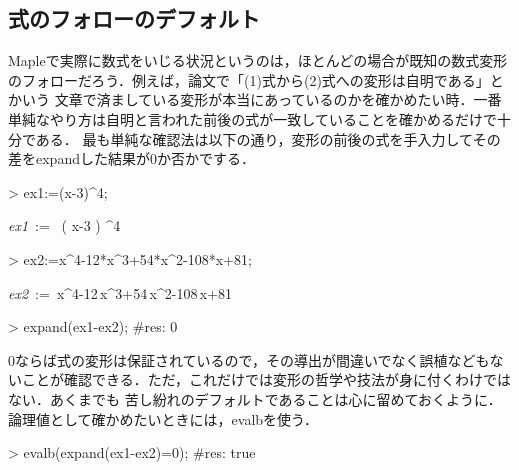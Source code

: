 \subsection{式のフォローのデフォルト}
Mapleで実際に数式をいじる状況というのは，ほとんどの場合が既知の数式変形のフォローだろう．例えば，論文で「(1)式から(2)式への変形は自明である」とかいう
文章で済ましている変形が本当にあっているのかを確かめたい時．一番単純なやり方は自明と言われた前後の式が一致していることを確かめるだけで十分である．
最も単純な確認法は以下の通り，変形の前後の式を手入力してその差をexpandした結果が0か否かでする．
\begin{MapleInput}
> ex1:=(x-3)^4;
\end{MapleInput}
\begin{MapleOutput}
{\it ex1}\, := \, \left( x-3 \right) ^{4}
\end{MapleOutput}

\begin{MapleInput}
> ex2:=x^4-12*x^3+54*x^2-108*x+81;
\end{MapleInput}
\begin{MapleOutput}
{\it ex2}\, := \,{x}^{4}-12\,{x}^{3}+54\,{x}^{2}-108\,x+81
\end{MapleOutput}

\begin{MapleInput}
> expand(ex1-ex2); #res: 0
\end{MapleInput}

0ならば式の変形は保証されているので，その導出が間違いでなく誤植などもないことが確認できる．ただ，これだけでは変形の哲学や技法が身に付くわけではない．あくまでも
苦し紛れのデフォルトであることは心に留めておくように．
論理値として確かめたいときには，evalbを使う．
\begin{MapleInput}
> evalb(expand(ex1-ex2)=0); #res: true
\end{MapleInput}
